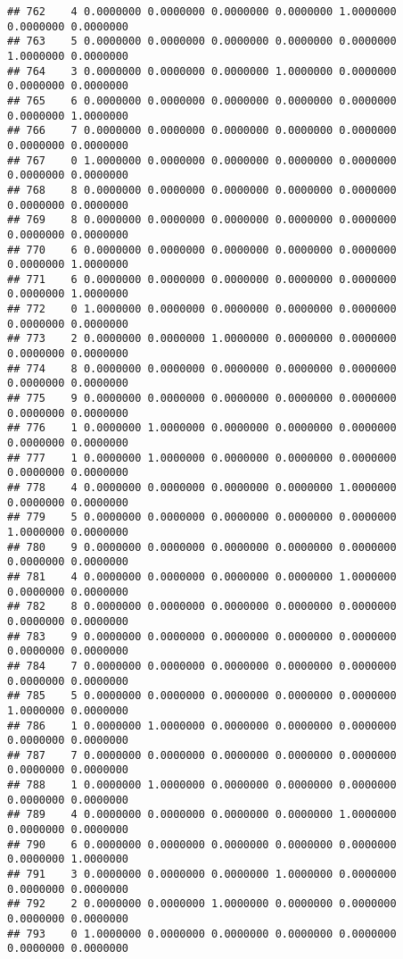 \documentclass[
]{article}
\begin{document}
\begin{verbatim}
## 762    4 0.0000000 0.0000000 0.0000000 0.0000000 1.0000000 0.0000000 0.0000000
## 763    5 0.0000000 0.0000000 0.0000000 0.0000000 0.0000000 1.0000000 0.0000000
## 764    3 0.0000000 0.0000000 0.0000000 1.0000000 0.0000000 0.0000000 0.0000000
## 765    6 0.0000000 0.0000000 0.0000000 0.0000000 0.0000000 0.0000000 1.0000000
## 766    7 0.0000000 0.0000000 0.0000000 0.0000000 0.0000000 0.0000000 0.0000000
## 767    0 1.0000000 0.0000000 0.0000000 0.0000000 0.0000000 0.0000000 0.0000000
## 768    8 0.0000000 0.0000000 0.0000000 0.0000000 0.0000000 0.0000000 0.0000000
## 769    8 0.0000000 0.0000000 0.0000000 0.0000000 0.0000000 0.0000000 0.0000000
## 770    6 0.0000000 0.0000000 0.0000000 0.0000000 0.0000000 0.0000000 1.0000000
## 771    6 0.0000000 0.0000000 0.0000000 0.0000000 0.0000000 0.0000000 1.0000000
## 772    0 1.0000000 0.0000000 0.0000000 0.0000000 0.0000000 0.0000000 0.0000000
## 773    2 0.0000000 0.0000000 1.0000000 0.0000000 0.0000000 0.0000000 0.0000000
## 774    8 0.0000000 0.0000000 0.0000000 0.0000000 0.0000000 0.0000000 0.0000000
## 775    9 0.0000000 0.0000000 0.0000000 0.0000000 0.0000000 0.0000000 0.0000000
## 776    1 0.0000000 1.0000000 0.0000000 0.0000000 0.0000000 0.0000000 0.0000000
## 777    1 0.0000000 1.0000000 0.0000000 0.0000000 0.0000000 0.0000000 0.0000000
## 778    4 0.0000000 0.0000000 0.0000000 0.0000000 1.0000000 0.0000000 0.0000000
## 779    5 0.0000000 0.0000000 0.0000000 0.0000000 0.0000000 1.0000000 0.0000000
## 780    9 0.0000000 0.0000000 0.0000000 0.0000000 0.0000000 0.0000000 0.0000000
## 781    4 0.0000000 0.0000000 0.0000000 0.0000000 1.0000000 0.0000000 0.0000000
## 782    8 0.0000000 0.0000000 0.0000000 0.0000000 0.0000000 0.0000000 0.0000000
## 783    9 0.0000000 0.0000000 0.0000000 0.0000000 0.0000000 0.0000000 0.0000000
## 784    7 0.0000000 0.0000000 0.0000000 0.0000000 0.0000000 0.0000000 0.0000000
## 785    5 0.0000000 0.0000000 0.0000000 0.0000000 0.0000000 1.0000000 0.0000000
## 786    1 0.0000000 1.0000000 0.0000000 0.0000000 0.0000000 0.0000000 0.0000000
## 787    7 0.0000000 0.0000000 0.0000000 0.0000000 0.0000000 0.0000000 0.0000000
## 788    1 0.0000000 1.0000000 0.0000000 0.0000000 0.0000000 0.0000000 0.0000000
## 789    4 0.0000000 0.0000000 0.0000000 0.0000000 1.0000000 0.0000000 0.0000000
## 790    6 0.0000000 0.0000000 0.0000000 0.0000000 0.0000000 0.0000000 1.0000000
## 791    3 0.0000000 0.0000000 0.0000000 1.0000000 0.0000000 0.0000000 0.0000000
## 792    2 0.0000000 0.0000000 1.0000000 0.0000000 0.0000000 0.0000000 0.0000000
## 793    0 1.0000000 0.0000000 0.0000000 0.0000000 0.0000000 0.0000000 0.0000000

\end{verbatim}
\end{document}
